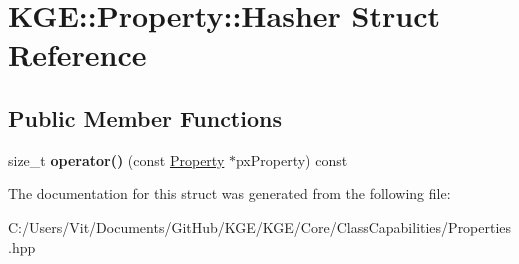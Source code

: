\hypertarget{struct_k_g_e_1_1_property_1_1_hasher}{\section{K\-G\-E\-:\-:Property\-:\-:Hasher Struct Reference}
\label{struct_k_g_e_1_1_property_1_1_hasher}
}
\subsection*{Public Member Functions}
\begin{DoxyCompactItemize}
\item 
\hypertarget{struct_k_g_e_1_1_property_1_1_hasher_a918137589319773790cf38900e65c01e}{size\-\_\-t {\bfseries operator()} (const \hyperlink{class_k_g_e_1_1_property}{Property} $\ast$px\-Property) const }\label{struct_k_g_e_1_1_property_1_1_hasher_a918137589319773790cf38900e65c01e}

\end{DoxyCompactItemize}


The documentation for this struct was generated from the following file\-:\begin{DoxyCompactItemize}
\item 
C\-:/\-Users/\-Vit/\-Documents/\-Git\-Hub/\-K\-G\-E/\-K\-G\-E/\-Core/\-Class\-Capabilities/Properties.\-hpp\end{DoxyCompactItemize}
